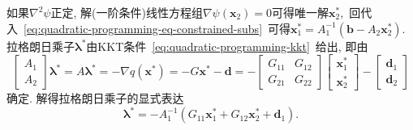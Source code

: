 \documentclass{SBCbookchapter}
\newcommand{\V}[1]{{\bm{#1}}}
\numberwithin{equation}{section}
\begin{document}
如果$\nabla^2 \psi$正定, 解(一阶条件)线性方程组$\nabla \psi (\V{x}_2) = 0$可得唯一解$\V{x}_2^*,$ 回代入~\eqref{eq:quadratic-programming-eq-constrained-subs}~可得$\V{x}_1^* = A_1^{-1} ( \V{b} - A_2 \V{x}_2^* ).$ 拉格朗日乘子$\V{\lambda}^*$由KKT条件~\eqref{eq:quadratic-programming-kkt}~给出, 即由
\begin{equation}
\label{eq:quadratic-programming-eq-lambda}
\begin{bmatrix} A_1 \\ A_2 \end{bmatrix} \V{\lambda}^* = A \V{\lambda}^* = -\nabla q(\V{x}^*) = - G \V{x}^* - \V{d} = - \begin{bmatrix} G_{11} & G_{12} \\ G_{21} & G_{22} \end{bmatrix} \begin{bmatrix} \V{x}_1^* \\ \V{x}_2^* \end{bmatrix} - \begin{bmatrix} \V{d}_1 \\ \V{d}_2 \end{bmatrix}
\end{equation}
确定. 解得拉格朗日乘子的显式表达
\begin{equation*}
\V{\lambda}^* = -A_1^{-1} \left( G_{11} \V{x}_1^* + G_{12} \V{x}_2^* + \V{d}_1 \right).
\end{equation*}
\end{document}
